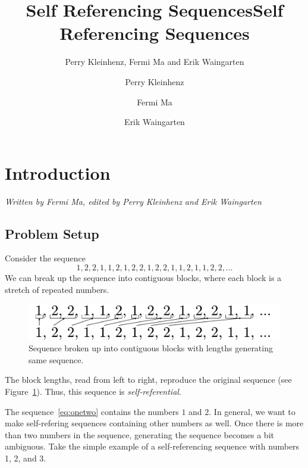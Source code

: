 \documentclass[runningheads,a4paper]{llncs}
\title{Self Referencing Sequences}
\author{Perry Kleinhenz, Fermi Ma and Erik Waingarten}
\date{}							%
\begin{document}
\title{Self Referencing Sequences}

\author{Perry Kleinhenz \and Fermi Ma \and Erik Waingarten}
%


\maketitle

\section{Introduction}

\emph{Written by Fermi Ma, edited by Perry Kleinhenz and Erik Waingarten}

\subsection{Problem Setup}
Consider the sequence
\begin{equation}
\label{eq:onetwo}
1,2,2,1,1,2,1,2,2,1,2,2,1,1,2,1,1,2,2,\dots
\end{equation}
We can break up the sequence into contiguous blocks, where each block is a stretch of repeated numbers.
\begin{figure}
\label{fig:sequenceblocks}
\center
\includegraphics[width=0.5\linewidth]{sequenceBlocks.pdf}
\caption{Sequence broken up into contiguous blocks with lengths generating same sequence.}
\end{figure}
The block lengths, read from left to right, reproduce the original sequence (see Figure~\ref{fig:sequenceblocks}). 
Thus, this sequence is \emph{self-referential}.

The sequence~\ref{eq:onetwo} contains the numbers $1$ and $2$. In general, we want to make self-refering sequences containing other numbers as well. Once there is more than two numbers in the sequence, generating the sequence becomes a bit ambiguous. Take the simple example of a self-referencing sequence with numbers 1, 2, and 3. 
\end{document}
